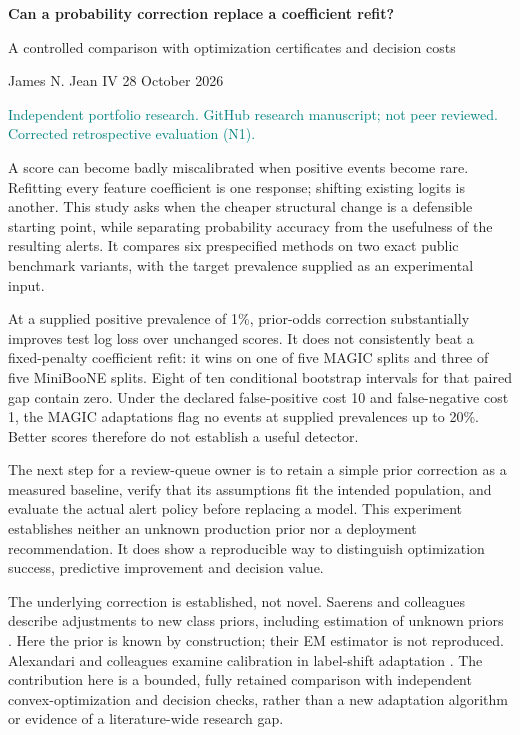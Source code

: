 \documentclass[10pt]{article}
\newcommand{\smallhead}[1]{\vspace{6pt}{\large\bfseries #1}\par}
\begin{document}
{\LARGE\bfseries Can a probability correction replace a coefficient refit?}\par
{\large A controlled comparison with optimization certificates and decision costs}\par
James N. Jean IV \hfill 28 October 2026\par
\textcolor{teal}{Independent portfolio research. GitHub research manuscript; not peer reviewed. Corrected retrospective evaluation (N1).}

\smallhead{The decision}
A score can become badly miscalibrated when positive events become rare. Refitting every feature coefficient is one response; shifting existing logits is another. This study asks when the cheaper structural change is a defensible starting point, while separating probability accuracy from the usefulness of the resulting alerts. It compares six prespecified methods on two exact public benchmark variants, with the target prevalence supplied as an experimental input.

At a supplied positive prevalence of 1\%, prior-odds correction substantially improves test log loss over unchanged scores. It does not consistently beat a fixed-penalty coefficient refit: it wins on one of five MAGIC splits and three of five MiniBooNE splits. Eight of ten conditional bootstrap intervals for that paired gap contain zero. Under the declared false-positive cost 10 and false-negative cost 1, the MAGIC adaptations flag no events at supplied prevalences up to 20\%. Better scores therefore do not establish a useful detector.

\smallhead{Why this comparison is useful}
The next step for a review-queue owner is to retain a simple prior correction as a measured baseline, verify that its assumptions fit the intended population, and evaluate the actual alert policy before replacing a model. This experiment establishes neither an unknown production prior nor a deployment recommendation. It does show a reproducible way to distinguish optimization success, predictive improvement and decision value.

The underlying correction is established, not novel. Saerens and colleagues describe adjustments to new class priors, including estimation of unknown priors \cite{saerens}. Here the prior is known by construction; their EM estimator is not reproduced. Alexandari and colleagues examine calibration in label-shift adaptation \cite{alexandari}. The contribution here is a bounded, fully retained comparison with independent convex-optimization and decision checks, rather than a new adaptation algorithm or evidence of a literature-wide research gap.
\end{document}
